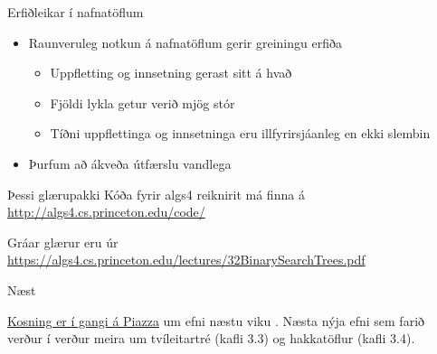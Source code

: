 \documentclass{beamer}
\begin{document}




\begin{frame}{Erfiðleikar í nafnatöflum}
	\begin{itemize}
		\item Raunveruleg notkun á nafnatöflum gerir greiningu erfiða
		      \begin{itemize}
			      \item Uppfletting og innsetning gerast sitt á hvað
			      \item Fjöldi lykla getur verið mjög stór
			      \item Tíðni uppflettinga og innsetninga eru illfyrirsjáanleg en ekki slembin
		      \end{itemize}
		\item Þurfum að ákveða útfærslu vandlega
	\end{itemize}
\end{frame}

\begin{frame}{Þessi glærupakki}
    Kóða fyrir algs4 reiknirit má finna á \url{http://algs4.cs.princeton.edu/code/}
    
    Gráar glærur eru úr \url{https://algs4.cs.princeton.edu/lectures/32BinarySearchTrees.pdf}
\end{frame}

\begin{frame}{Næst}

    \href{https://piazza.com/class/jc3kcn5f4sn1cc?cid=214}{Kosning er í gangi á Piazza} um efni næstu viku . Næsta nýja efni sem farið verður í verður meira um tvíleitartré (kafli 3.3) og hakkatöflur (kafli 3.4).
\end{frame}
\end{document}
